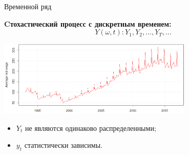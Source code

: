 \documentclass[10pt,pdf,utf8,hyperref={unicode},aspectratio=169]{beamer}
\begin{document}
\begin{frame}{Временной ряд}{}

\textbf{Cтохастический процесс с дискретным временем:}
$$
	Y(\omega, t)\colon Y_1, Y_2, \ldots, Y_T, \ldots
$$
\begin{center}
	\includegraphics[width=0.7\textwidth]{wage.png}
\end{center}


\begin{itemize}
    \item $Y_t$ не являются одинаково распределенными;
    \item $y_t$ статистически зависимы.
\end{itemize}
\end{frame}
\end{document}
